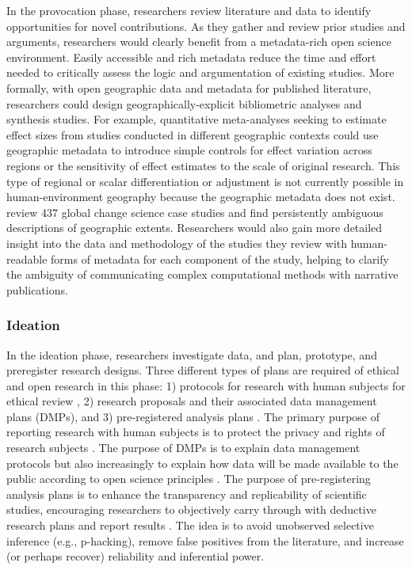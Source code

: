 \documentclass{isprs} %
\begin{document}
In the provocation phase, researchers review literature and data to identify opportunities for novel contributions.
As they gather and review prior studies and arguments, researchers would clearly benefit from a metadata-rich open science environment.
Easily accessible and rich metadata reduce the time and effort needed to critically assess the logic and argumentation of existing studies.
More formally, with open geographic data and metadata for published literature, researchers could design geographically-explicit bibliometric analyses and synthesis studies.
For example, quantitative meta-analyses seeking to estimate effect sizes from studies conducted in different geographic contexts could use geographic metadata to introduce simple controls for effect variation across regions or the sensitivity of effect estimates to the scale of original research. 
This type of regional or scalar differentiation or adjustment is not currently possible in human-environment geography because the geographic metadata does not exist.
\citet{Margulies2016} review 437 global change science case studies and find persistently ambiguous descriptions of geographic extents. 
Researchers would also gain more detailed insight into the data and methodology of the studies they review with human-readable forms of metadata for each component of the study, helping to clarify the ambiguity of communicating complex computational methods with narrative publications.

\subsubsection{Ideation}

In the ideation phase, researchers investigate data, and plan, prototype, and preregister research designs.
Three different types of plans are required of ethical and open research in this phase: 1) protocols for research with human subjects for ethical review \citep{DHEW1978}, 2) research proposals and their associated data management plans (DMPs)\citep{NSF2021}, and 3) pre-registered analysis plans \citep{Nosek2018}. 
The primary purpose of reporting research with human subjects is to protect the privacy and rights of research subjects \citep{DHEW1978}. 
The purpose of DMPs is to explain data management protocols \citep{NSF2021} but also increasingly to explain how data will be made available to the public according to open science principles \citep{Gil2016}. 
The purpose of pre-registering analysis plans is to enhance the transparency and replicability of scientific studies, encouraging researchers to objectively carry through with deductive research plans and report results \citep{Nosek2018}. 
The idea is to avoid unobserved selective inference (e.g., p-hacking), remove false positives from the literature, and increase (or perhaps recover) reliability and inferential power.
\end{document}
